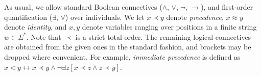 \documentclass[11pt,a4paper]{article}
\begin{document}
As usual, we allow standard Boolean connectives ($\wedge$, $\vee$, $\neg$, $\rightarrow $), and first-order quantification ($\exists$, $\forall $) over individuals. 
We let $x \prec y$ denote \emph{precedence}, $x \approx y$ denote \emph{identity}, and $x, y$ denote variables ranging over positions in a finite string $w \in \Sigma^*$. Note that $\prec$ is a strict total order.
The remaining logical connectives are obtained from the given ones in the standard fashion, and brackets may be dropped where convenient. 
For example, \emph{immediate precedence} is defined as $x \triangleleft y \leftrightarrow x \prec y \wedge \neg \exists z [ x \prec z \wedge z \prec y ]$.
%
\end{document}
